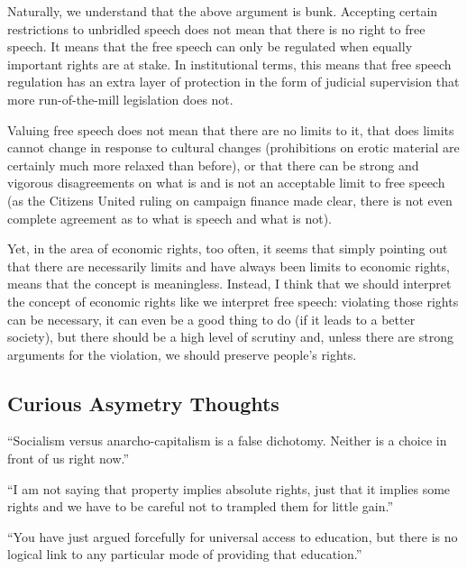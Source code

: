 Naturally, we understand that the above argument is bunk. Accepting certain
restrictions to unbridled speech does not mean that there is no right to free
speech. It means that the free speech can only be regulated when equally
important rights are at stake. In institutional terms, this means that free
speech regulation has an extra layer of protection in the form of judicial
supervision that more run-of-the-mill legislation does not.

Valuing free speech does not mean that there are no limits to it, that does
limits cannot change in response to cultural changes (prohibitions on erotic
material are certainly much more relaxed than before), or that there can be
strong and vigorous disagreements on what is and is not an acceptable limit to
free speech (as the Citizens United ruling on campaign finance made clear,
there is not even complete agreement as to what is speech and what is not).

Yet, in the area of economic rights, too often, it seems that simply pointing
out that there are necessarily limits and have always been limits to economic
rights, means that the concept is meaningless. Instead, I think that we should
interpret the concept of economic rights like we interpret free speech:
violating those rights can be necessary, it can even be a good thing to do (if
it leads to a better society), but there should be a high level of scrutiny
and, unless there are strong arguments for the violation, we should preserve
people's rights.

\subsection{Curious Asymetry Thoughts}

``Socialism versus anarcho-capitalism is a false dichotomy. Neither is a choice
in front of us right now.''

``I am not saying that property implies absolute rights, just that it implies
some rights and we have to be careful not to trampled them for little gain.''

``You have just argued forcefully for universal access to education, but there
is no logical link to any particular mode of providing that education.''

